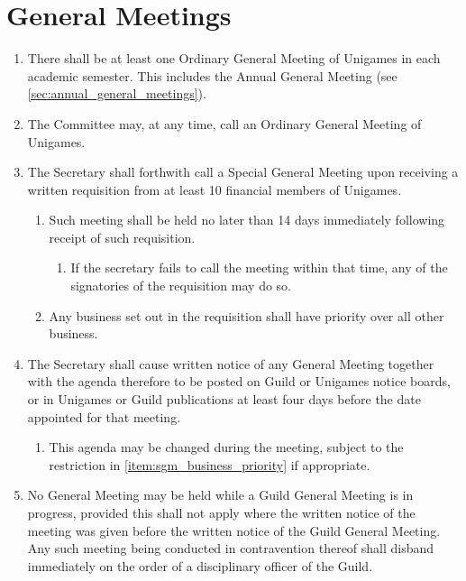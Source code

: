 \documentclass[a4paper]{article}
\begin{document}
\section{General Meetings} \label{sec:general_meetings}
\begin{enumerate}
    \item There shall be at least one Ordinary General Meeting of Unigames in each academic semester. This includes the Annual General Meeting (see \cref{sec:annual_general_meetings}).
    \item The Committee may, at any time, call an Ordinary General Meeting of Unigames.
    \item The Secretary shall forthwith call a Special General Meeting upon receiving a written requisition from at least 10 financial members of Unigames.
          \begin{enumerate}
              \item Such meeting shall be held no later than 14 days immediately following receipt of such requisition.
                    \begin{enumerate}
                        \item If the secretary fails to call the meeting within that time, any of the signatories of the requisition may do so.
                    \end{enumerate}
              \item \label{item:sgm_business_priority} Any business set out in the requisition shall have priority over all other business.
          \end{enumerate}
    \item The Secretary shall cause written notice of any General Meeting together with the agenda therefore to be posted on Guild or Unigames notice boards, or in Unigames or Guild publications at least four days before the date appointed for that meeting.
          \begin{enumerate}
              \item This agenda may be changed during the meeting, subject to the restriction in \cref{item:sgm_business_priority} if appropriate.
          \end{enumerate}
    \item No General Meeting may be held while a Guild General Meeting is in progress, provided this shall not apply where the written notice of the meeting was given before the written notice of the Guild General Meeting. Any such meeting being conducted in contravention thereof shall disband immediately on the order of a disciplinary officer of the Guild.

\end{enumerate}
\end{document}
